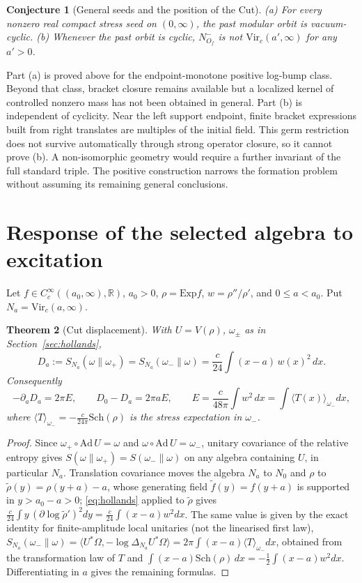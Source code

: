 \documentclass[12pt]{article}
\newtheorem{theorem}{Theorem}[section]
\newtheorem{conjecture}[theorem]{Conjecture}
\theoremstyle{definition}
\theoremstyle{remark}
\begin{document}
\begin{conjecture}[General seeds and the position of the Cut]\label{conj:T1}
(a) For every nonzero real compact stress seed on \((0,\infty)\), the past
modular orbit is vacuum-cyclic.
(b) Whenever the past orbit is cyclic, \(N^-_{O_f}\) is not
\(\mathrm{Vir}_c(a',\infty)\) for any \(a'>0\).
\end{conjecture}
Part (a) is proved above for the endpoint-monotone positive log-bump class.
Beyond that class, bracket closure remains available but a localized kernel of
controlled nonzero mass has not been obtained in general.
Part (b) is independent of cyclicity. Near the left support endpoint, finite
bracket expressions built from right translates are multiples of the initial
field. This germ restriction does not survive automatically through strong
operator closure, so it cannot prove (b). A non-isomorphic geometry would
require a further invariant of the full standard triple.
The positive construction narrows the formation problem without assuming its
remaining general conclusions.

\section{Response of the selected algebra to excitation}\label{sec:response}

Let \(f\in C_c^\infty((a_0,\infty),\mathbb R)\), \(a_0>0\), \(\rho=\mathrm{Exp}f\),
\(w=\rho''/\rho'\), and \(0\le a<a_0\). Put \(N_a=\mathrm{Vir}_c(a,\infty)\).

\begin{theorem}[Cut displacement]\label{thm:displacement}
With \(U=V(\rho)\), \(\omega_\pm\) as in Section~\ref{sec:hollands},
\[
D_a:=S_{N_a}(\omega\|\omega_+)=S_{N_a}(\omega_-\|\omega)=\frac c{24}\int(x-a)\,w(x)^2\,dx .
\]
Consequently
\[
-\partial_aD_a=2\pi E,\qquad D_0-D_a=2\pi aE,\qquad
E=\frac c{48\pi}\int w^2\,dx=\int\langle T(x)\rangle_{\omega_-}dx,
\]
where \(\langle T\rangle_{\omega_-}=-\tfrac c{24\pi}\mathrm{Sch}(\rho)\) is the stress
expectation in \(\omega_-\).
\end{theorem}
\begin{proof}
Since \(\omega_+\circ\mathrm{Ad}\,U=\omega\) and \(\omega\circ\mathrm{Ad}\,U=\omega_-\),
unitary covariance of the relative entropy gives
\(S(\omega\|\omega_+)=S(\omega_-\|\omega)\) on any algebra containing \(U\), in
particular \(N_a\). Translation covariance moves the algebra \(N_a\) to \(N_0\) and
\(\rho\) to \(\tilde\rho(y)=\rho(y+a)-a\), whose generating field
\(\tilde f(y)=f(y+a)\) is supported in \(y>a_0-a>0\); \eqref{eq:hollands} applied to
\(\tilde\rho\) gives \(\frac c{24}\int y\,(\partial\log\tilde\rho')^2dy=\frac c{24}\int(x-a)w^2dx\).
The same value is given by the exact identity for finite-amplitude local unitaries (not the linearised first law),
\(S_{N_a}(\omega_-\|\omega)=\langle U^*\Omega,-\log\Delta_{N_a}U^*\Omega\rangle
=2\pi\int(x-a)\langle T\rangle_{\omega_-}dx\), obtained from the transformation law of
\(T\) and \(\int(x-a)\mathrm{Sch}(\rho)\,dx=-\tfrac12\int(x-a)w^2dx\). Differentiating in
\(a\) gives the remaining formulas.
\end{proof}
\end{document}
